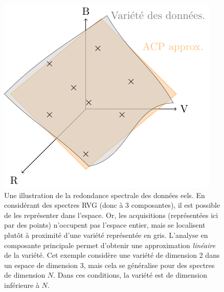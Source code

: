     \begin{figure}[htb]
    	\centering
    	\includegraphics[]{img/chapitre2/figure8/redondance.pdf}
    	\caption{Une illustration de la redondance spectrale des données \gls{eels}. En considérant des spectres RVG (donc à 3 composantes), il est possible de les représenter dans l'espace. Or, les acquisitions (représentées ici par des points) n'occupent pas l'espace entier, mais se localisent plutôt à proximité d'une variété représentée en gris. L'analyse en composante principale permet d'obtenir une approximation \emph{linéaire} de la variété. Cet exemple considère une variété de dimension 2 dans un espace de dimension 3, mais cela se généralise pour des spectres de dimension $N$. Dans ces conditions, la variété est de dimension inférieure à $N$.
            \protect\label{fig-correlation}}
    \end{figure}


